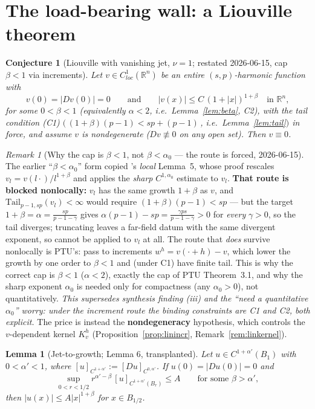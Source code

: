 \documentclass[11pt]{amsart}
\theoremstyle{plain}
\newtheorem{lemma}[theorem]{Lemma}
\newtheorem{conjecture}[theorem]{Conjecture}
\theoremstyle{definition}
\theoremstyle{remark}
\newtheorem{remark}[theorem]{Remark}
\newcommand{\R}{\mathbb{R}}
\newcommand{\al}{\alpha}
\newcommand{\Tail}{\mathrm{Tail}_{p-1,sp}}
\begin{document}
\section{The load-bearing wall: a Liouville theorem}\label{sec:liouville}
\begin{conjecture}[Liouville with vanishing jet, $\nu=1$;
restated 2026-06-15, cap $\beta<1$ via increments]\label{conj:liouville}
Let $v\in C^{1}_{loc}(\R^n)$ be an entire $(s,p)$-harmonic function with
\[
  v(0)=|Dv(0)|=0
  \qquad\text{and}\qquad
  |v(x)|\le C\,(1+|x|)^{1+\beta}\quad\text{in }\R^n,
\]
for some $0<\beta<1$ (equivalently $\al<2$, i.e.\ Lemma~\ref{lem:beta},
C2), with the tail condition \emph{(C1)} $(\,(1+\beta)(p-1)<sp+(p-1)\,$,
i.e.\ Lemma~\ref{lem:tail}$)$ in force, and assume $v$ is
\emph{nondegenerate} ($Dv\not\equiv0$ on any open set). Then $v\equiv0$.
\end{conjecture}
\begin{remark}[Why the cap is $\beta<1$, not $\beta<\al_0$ --- the route is
forced, 2026-06-15]\label{rem:routeforced}
The earlier ``$\beta<\al_0$'' form copied \cite{CP}'s \emph{local} Lemma~5,
whose proof rescales $v_l=v(l\cdot)/l^{1+\beta}$ and applies the
\emph{sharp} $C^{1,\al_0}$ estimate to $v_l$. \textbf{That route is blocked
nonlocally:} $v_l$ has the same growth $1+\beta$ as $v$, and
$\Tail(v_l)<\infty$ would require $(1+\beta)(p-1)<sp$ --- but the target
$1+\beta=\al=\frac{sp}{p-1-\gamma}$ gives $\al(p-1)-sp=\frac{\gamma ps}{p-1-\gamma}>0$
for \emph{every} $\gamma>0$, so the tail diverges; truncating leaves a
far-field datum with the same divergent exponent, so \cite{GJS} cannot be
applied to $v_l$ at all. The route that \emph{does} survive nonlocally is
PTU's: pass to increments $w^h=v(\cdot+h)-v$, which lower the growth by one
order to $\beta<1$ and (under C1) have finite tail. This is why the correct
cap is $\beta<1$ ($\al<2$), exactly the cap of PTU Theorem~3.1, and why the
sharp exponent $\al_0$ is needed only for compactness (any $\al_0>0$), not
quantitatively. \emph{This supersedes synthesis finding (iii) and the
``need a quantitative $\al_0$'' worry: under the increment route the
binding constraints are C1 and C2, both explicit.} The price is instead the
\textbf{nondegeneracy} hypothesis, which controls the $v$-dependent kernel
$K_v^h$ (Proposition~\ref{prop:linincr}, Remark~\ref{rem:linkernel}).
\end{remark}
\begin{lemma}[Jet-to-growth; \cite{CP} Lemma 6, transplanted]\label{lem:jet}
Let $u\in C^{1+\al'}(B_1)$ with $0<\al'<1$, where
$[u]_{C^{1+\al'}}:=[Du]_{C^{0,\al'}}$. If $u(0)=|Du(0)|=0$ and
\[
  \sup_{0<r<1/2} r^{\al'-\beta}\,[u]_{C^{1+\al'}(B_r)} \le A
  \qquad\text{for some } \beta>\al',
\]
then $|u(x)|\le A|x|^{1+\beta}$ for $x\in B_{1/2}$.
\end{lemma}
\end{document}
